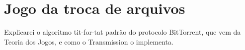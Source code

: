 
\section{Jogo da troca de arquivos}
\label{sec:titfortat}

Explicarei o algoritmo tit-for-tat padrão do protocolo BitTorrent, que vem da Teoria
dos Jogos, e como o Transmission o implementa.